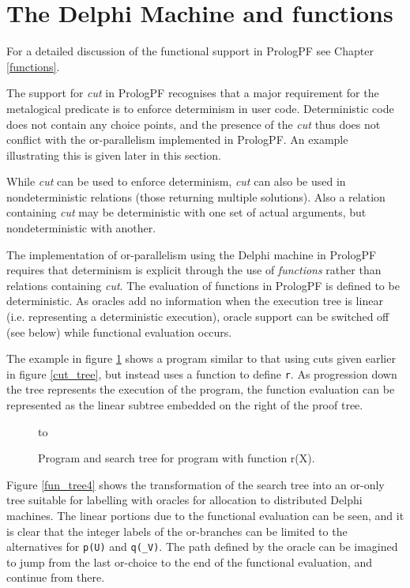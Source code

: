 \section{The Delphi Machine and functions} %

For a detailed discussion of the functional support in PrologPF see
Chapter \ref{functions}.

The support for \textit{cut} in PrologPF recognises that a major requirement for the
metalogical predicate is to enforce determinism in user code.
Deterministic code does not contain any choice points, and the presence of the 
\textit{cut} thus does not conflict with the or-parallelism implemented in
PrologPF.  An example illustrating this is given later in this section.

While \textit{cut} can be used to enforce determinism, \textit{cut} can also be
used in nondeterministic relations (those returning multiple solutions).  Also
a relation containing \textit{cut} may be deterministic with one set of actual
arguments, but nondeterministic with another.

The implementation of or-parallelism using the Delphi machine in PrologPF requires that
determinism is explicit through the use of \textit{functions} rather than
relations containing \textit{cut}.  The evaluation of functions in PrologPF
is defined to be deterministic.  As oracles add no information when the execution tree
is linear
(i.e. representing a deterministic execution), oracle support can be switched off
(see below) while functional evaluation occurs.

The example in figure \ref{fun_tree3} shows a program similar to that using cuts given
earlier in figure \ref{cut_tree}, but instead uses a function to define \texttt{r}.
As progression down the tree represents the execution of the program, the function
evaluation can be represented as the linear subtree embedded on the right of the
proof tree.

\begin{figure}[h]
\vspace{5mm} \hbox to 
\caption{Program and search tree for program with function r(X).}
\vspace{5mm}
\label{fun_tree3}
\end{figure}

Figure \ref{fun_tree4} shows the transformation of the search tree into an
or-only tree suitable for labelling with oracles for allocation to
distributed Delphi machines.  The linear portions due to the functional evaluation
can be seen, and it is clear that the integer labels of the or-branches can
be limited to the alternatives for \texttt{p(U)} and \texttt{q(\_{}V)}. The path
defined by the oracle can be imagined to jump from the last or-choice to the
end of the functional evaluation, and continue from there.

